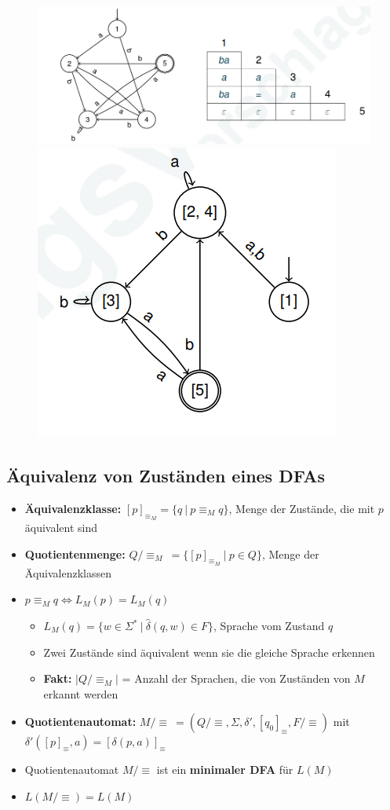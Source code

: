 \documentclass[ieeetran]{article}
\begin{document}
\begin{figure}[h!]
  \centering
  \includegraphics[width=0.65\linewidth]{minimierungdfa1}
  \includegraphics[width=0.3\linewidth]{minimierungdfa2}
  \label{fig:minimierungdfa1}
\end{figure}


\subsection{Äquivalenz von Zuständen eines DFAs} %
\label{sub:äquivalenz_von_zuständen_eines_dFAs}
\begin{itemize}
	\item \textbf{Äquivalenzklasse:} $[p]_{\equiv_M} = \{q \ | \ p \equiv_M q\}$, Menge der Zustände, die mit $p$ äquivalent sind
	\item \textbf{Quotientenmenge:} $Q/\!\equiv_M \  = \{ [p]_{\equiv_M} \ | \ p \in Q\}$, Menge der Äquivalenzklassen

  \item $p \equiv_M q \Leftrightarrow L_M(p) = L_M(q)$
\begin{itemize}
	\item $L_M(q) = \{w \in \Sigma^* \ | \ \hat{\delta}(q,w) \in F\}$, Sprache vom Zustand $q$
  \item Zwei Zustände sind äquivalent wenn sie die gleiche Sprache erkennen
\item \textbf{Fakt:} $|Q/\!\equiv_M \!|$ = Anzahl der Sprachen, die von Zuständen von $M$ erkannt werden


\end{itemize}
\item \textbf{Quotientenautomat:} $M/ \!\equiv \ = (Q/\!\equiv, \Sigma, \delta',[q_0]_{\equiv}, F/\!\equiv)$ mit $\delta'([p]_{\equiv}, a) = [\delta(p,a)]_{\equiv}$
\item Quotientenautomat $M/\!\equiv$ ist ein \textbf{minimaler DFA} für $L(M)$
\item $L(M/\!\equiv) = L(M)$\end{itemize}
\end{document}
